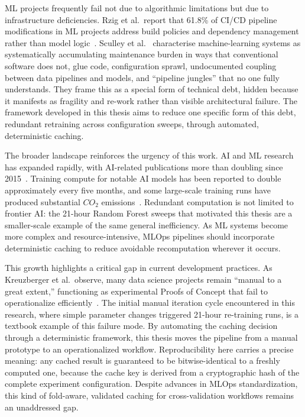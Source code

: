 ML projects frequently fail not due to algorithmic limitations but due to infrastructure deficiencies. Rzig et al.\ report that 61.8\% of CI/CD pipeline modifications in ML projects address build policies and dependency management rather than model logic~\cite{rzig2024empirical}. Sculley et al.~\cite{sculley2015hidden} characterise machine-learning systems as systematically accumulating maintenance burden in ways that conventional software does not, glue code, configuration sprawl, undocumented coupling between data pipelines and models, and ``pipeline jungles'' that no one fully understands. They frame this as a special form of technical debt, hidden because it manifests as fragility and re-work rather than visible architectural failure. The framework developed in this thesis aims to reduce one specific form of this debt, redundant retraining across configuration sweeps, through automated, deterministic caching.

The broader landscape reinforces the urgency of this work. AI and ML research has expanded rapidly, with AI-related publications more than doubling since 2015~\cite{AIIndex2023}. Training compute for notable AI models has been reported to double approximately every five months, and some large-scale training runs have produced substantial $CO_2$ emissions~\cite{AIIndex2025}. Redundant computation is not limited to frontier AI: the 21-hour Random Forest sweeps that motivated this thesis are a smaller-scale example of the same general inefficiency. As ML systems become more complex and resource-intensive, MLOps pipelines should incorporate deterministic caching to reduce avoidable recomputation wherever it occurs.

This growth highlights a critical gap in current development practices. As Kreuzberger et al.\ observe, many data science projects remain ``manual to a great extent,'' functioning as experimental Proofs of Concept that fail to operationalize efficiently~\cite{kreuzberger2023mlops}. The initial manual iteration cycle encountered in this research, where simple parameter changes triggered 21-hour re-training runs, is a textbook example of this failure mode. By automating the caching decision through a deterministic framework, this thesis moves the pipeline from a manual prototype to an operationalized workflow. Reproducibility here carries a precise meaning: any cached result is guaranteed to be bitwise-identical to a freshly computed one, because the cache key is derived from a cryptographic hash of the complete experiment configuration. Despite advances in MLOps standardization, this kind of fold-aware, validated caching for cross-validation workflows remains an unaddressed gap.



